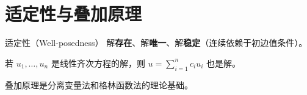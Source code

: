\section{适定性与叠加原理}

\begin{mydefinition}{适定性（Well-posedness）}
解\textbf{存在}、解\textbf{唯一}、解\textbf{稳定}（连续依赖于初边值条件）。
\end{mydefinition}

\begin{theorem}[叠加原理]
若 $u_1,\ldots,u_n$ 是线性齐次方程的解，则 $u=\sum_{i=1}^{n}c_i u_i$ 也是解。
\end{theorem}

\begin{remark}
叠加原理是分离变量法和格林函数法的理论基础。
\end{remark}
